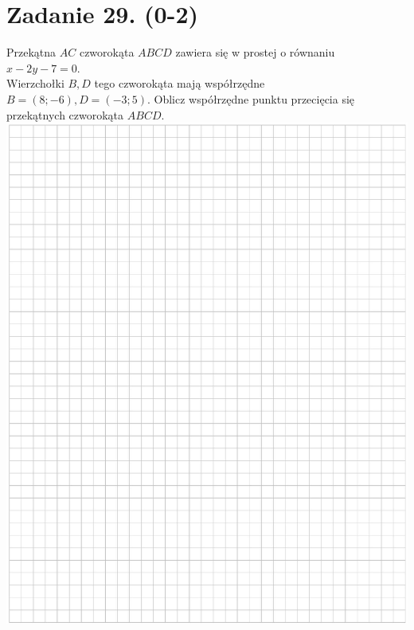 \documentclass[10pt]{article}
\begin{document}
\section*{Zadanie 29. (0-2)}
Przekątna \(A C\) czworokąta \(A B C D\) zawiera się w prostej o równaniu \(x-2 y-7=0\).\\
Wierzchołki \(B, D\) tego czworokąta mają współrzędne \(B=(8 ;-6), D=(-3 ; 5)\). Oblicz współrzędne punktu przecięcia się przekątnych czworokąta \(A B C D\).\\
\includegraphics[max width=\textwidth, center]{2024_11_21_94f02db55673a8a7b820g-15}
\end{document}
